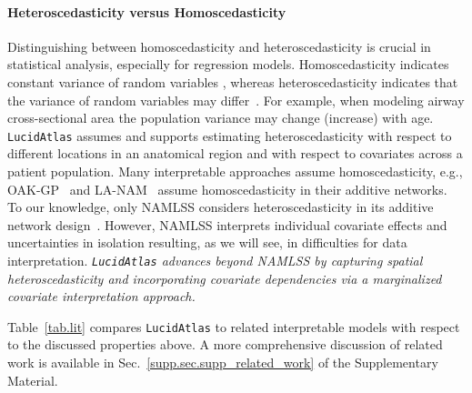 \paragraph{Heteroscedasticity versus Homoscedasticity}
Distinguishing between homoscedasticity and heteroscedasticity is crucial in statistical analysis, especially for regression models. Homoscedasticity indicates constant variance of random variables , whereas heteroscedasticity indicates that the variance of random variables may differ~\citep{wooldridge2016homohetr}. For example, when modeling airway cross-sectional area the population variance may change (increase) with age. \texttt{LucidAtlas} assumes and supports estimating heteroscedasticity with respect to different locations in an anatomical region and with respect to covariates across a patient population. Many interpretable approaches assume homoscedasticity, e.g., OAK-GP~\citep{lu2022oak} and LA-NAM~\citep{bouchiat2023lanam} assume homoscedasticity in their additive networks. To our knowledge, only NAMLSS considers heteroscedasticity in its additive network design~\citep{thielmann2024namlss}. However, NAMLSS interprets individual covariate effects and uncertainties in isolation resulting, as we will see, in difficulties for data interpretation. \emph{\texttt{LucidAtlas} advances beyond NAMLSS by capturing spatial heteroscedasticity and incorporating covariate dependencies via a marginalized covariate interpretation approach.}%

Table~\ref{tab.lit} compares \texttt{LucidAtlas} to related interpretable models with respect to the discussed properties above. A more comprehensive discussion of
related work is available in Sec.~\ref{supp.sec.supp_related_work} of the Supplementary Material.